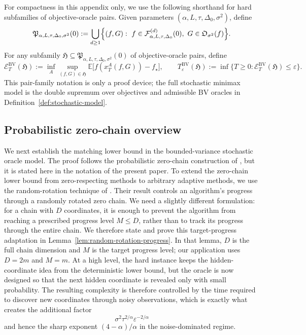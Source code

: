 \documentclass[11pt]{article}
\newcommand{\E}{\mathbb{E}}
\begin{document}
For compactness in this appendix only, we use the following shorthand for hard subfamilies of objective-oracle pairs.
Given parameters \((\alpha,L,\tau,\Delta_0,\sigma^2)\), define
\begin{equation}
\label{eq:stochastic-pair-family}
\mathfrak P_{\alpha,L,\tau,\Delta_0,\sigma^2}(0)
:=
\bigcup_{d\ge 1}
\Bigl\{(f,G):\
f\in\mathcal F^{(d)}_{\alpha,L,\tau,\Delta_0}(0),\
G\in\mathfrak O_{\sigma^2}(f)
\Bigr\}.
\end{equation}
For any subfamily \(\mathfrak H\subseteq
\mathfrak P_{\alpha,L,\tau,\Delta_0,\sigma^2}(0)\) of objective-oracle pairs, define
\begin{equation}
\label{eq:pair-family-minimax}
\mathcal E_T^{\mathrm{BV}}(\mathfrak H)
:=
\inf_A\sup_{(f,G)\in\mathfrak H}\E\bigl[f(x_T^A(f,G))-f_\star\bigr],
\qquad
T_\varepsilon^{\mathrm{BV}}(\mathfrak H)
:=
\inf\bigl\{T\ge 0:\mathcal E_T^{\mathrm{BV}}(\mathfrak H)\le\varepsilon\bigr\}.
\end{equation}
This pair-family notation is only a proof device; the full stochastic minimax model is the double supremum over
objectives and admissible BV oracles in Definition~\ref{def:stochastic-model}.

\subsection{Probabilistic zero-chain overview}
\label{app:sto-lb-overview}

We next establish the matching lower bound in the bounded-variance stochastic oracle model. The proof follows the
probabilistic zero-chain construction of \citet{ArjevaniEtAl2019}, but it is stated here in the notation of the
present paper.
To extend the zero-chain lower bound from zero-respecting methods to arbitrary adaptive methods, we use the
random-rotation technique of \citet[Lemma~5 and Appendix~B.1]{ArjevaniEtAl2019}. Their result controls an algorithm's
progress through a randomly rotated zero chain. We need a slightly different formulation: for a chain with \(D\)
coordinates, it is enough to prevent the algorithm from reaching a prescribed progress level \(M\le D\), rather than
to track its progress through the entire chain. We therefore state and prove this target-progress adaptation in
Lemma~\ref{lem:random-rotation-progress}. In that lemma, \(D\) is the full chain dimension and \(M\) is the target
progress level; our application uses \(D=2m\) and \(M=m\).
At a high level, the hard instance keeps the hidden-coordinate idea from the deterministic
lower bound, but the oracle is now designed so that the next hidden coordinate is revealed only with small probability.
The resulting complexity is therefore controlled by the time required to discover new coordinates through noisy
observations, which is exactly what creates the
additional factor
\[
\sigma^2\tau^{2/\alpha}\varepsilon^{-2/\alpha}
\]
and hence the sharp exponent \((4-\alpha)/\alpha\) in the noise-dominated regime.
\end{document}
